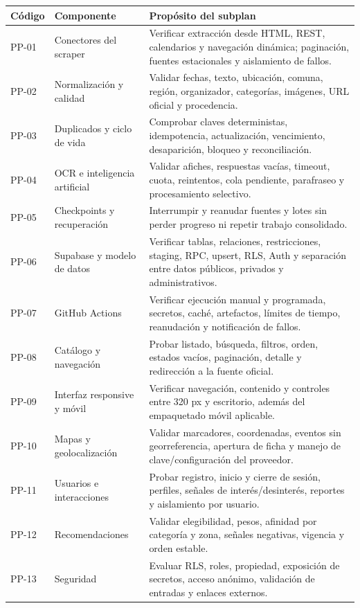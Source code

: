 \documentclass[11pt,a4paper]{article}
\begin{document}
\begin{longtable}{@{}L{1.4cm}L{4.1cm}L{9.4cm}@{}}
\toprule
\textbf{Código} & \textbf{Componente} & \textbf{Propósito del subplan} \\
\midrule
\endhead
PP-01 & Conectores del scraper & Verificar extracción desde HTML, REST, calendarios y navegación dinámica; paginación, fuentes estacionales y aislamiento de fallos. \\
PP-02 & Normalización y calidad & Validar fechas, texto, ubicación, comuna, región, organizador, categorías, imágenes, URL oficial y procedencia. \\
PP-03 & Duplicados y ciclo de vida & Comprobar claves deterministas, idempotencia, actualización, vencimiento, desaparición, bloqueo y reconciliación. \\
PP-04 & OCR e inteligencia artificial & Validar afiches, respuestas vacías, timeout, cuota, reintentos, cola pendiente, parafraseo y procesamiento selectivo. \\
PP-05 & Checkpoints y recuperación & Interrumpir y reanudar fuentes y lotes sin perder progreso ni repetir trabajo consolidado. \\
PP-06 & Supabase y modelo de datos & Verificar tablas, relaciones, restricciones, staging, RPC, upsert, RLS, Auth y separación entre datos públicos, privados y administrativos. \\
PP-07 & GitHub Actions & Verificar ejecución manual y programada, secretos, caché, artefactos, límites de tiempo, reanudación y notificación de fallos. \\
PP-08 & Catálogo y navegación & Probar listado, búsqueda, filtros, orden, estados vacíos, paginación, detalle y redirección a la fuente oficial. \\
PP-09 & Interfaz responsive y móvil & Verificar navegación, contenido y controles entre 320 px y escritorio, además del empaquetado móvil aplicable. \\
PP-10 & Mapas y geolocalización & Validar marcadores, coordenadas, eventos sin georreferencia, apertura de ficha y manejo de clave/configuración del proveedor. \\
PP-11 & Usuarios e interacciones & Probar registro, inicio y cierre de sesión, perfiles, señales de interés/desinterés, reportes y aislamiento por usuario. \\
PP-12 & Recomendaciones & Validar elegibilidad, pesos, afinidad por categoría y zona, señales negativas, vigencia y orden estable. \\
PP-13 & Seguridad & Evaluar RLS, roles, propiedad, exposición de secretos, acceso anónimo, validación de entradas y enlaces externos. \\

\end{longtable}
\end{document}
